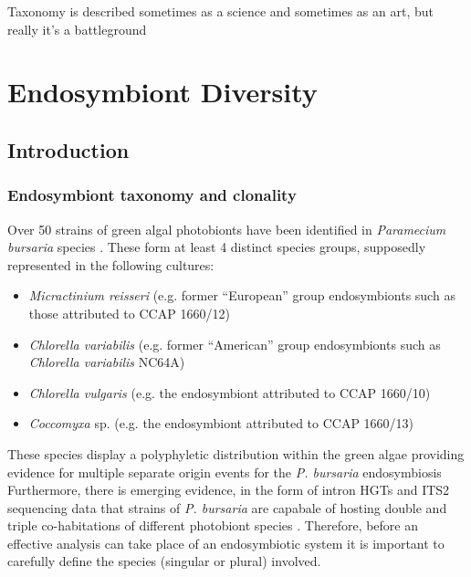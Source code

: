 % 
\graphicspath{{chapters/3.Chapter_1/figures/}}


\begin{savequote}[75mm]
    Taxonomy is described sometimes as a science and sometimes as an art, but really it's a battleground
\end{savequote}

\chapter{Endosymbiont Diversity}\label{chap:endo_diversity}

\section{Introduction}

\subsection{Endosymbiont taxonomy and clonality}

Over 50 strains of green algal photobionts have been identified in 
\textit{Paramecium bursaria} species \citep{Hoshina2010,Hoshina2004,Hoshina2009,Summerer2008,Vorobyev2009}. 
These form at least 4 distinct species groups, supposedly represented
in the following cultures:
\begin{itemize}
    \item \textit{Micractinium reisseri} (e.g. former ``European'' group endosymbionts such as those attributed to CCAP 1660/12)
    \item \textit{Chlorella variabilis} (e.g. former ``American'' group endosymbionts such as \textit{Chlorella variabilis} NC64A)
    \item \textit{Chlorella vulgaris} (e.g. the endosymbiont attributed to CCAP 1660/10)
    \item \textit{Coccomyxa} sp. (e.g. the endosymbiont attributed to CCAP 1660/13)
\end{itemize}
These species display a polyphyletic distribution within the green algae
providing evidence for multiple separate origin events for
the \textit{P. bursaria} endosymbiosis \citep{Hoshina2008,Hoshina2009}
Furthermore, there is emerging evidence, in the form
of intron HGTs and ITS2 sequencing data that strains of \textit{P. bursaria}
are capabale of hosting double and triple co-habitations of different
photobiont species \citep{Hoshina2012}. Therefore,
before an effective analysis can take place of
an endosymbiotic system it is important
to carefully define the species (singular or plural)
involved.

